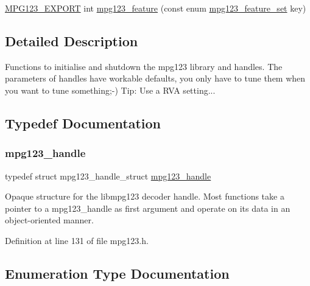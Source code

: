 \begin{DoxyCompactItemize}
\item 
\mbox{\hyperlink{mpg123_8h_a2ba98cfba3f760879df70e755b2a61cc}{M\+P\+G123\+\_\+\+E\+X\+P\+O\+RT}} int \mbox{\hyperlink{group__mpg123__init_gaf9b00e4fc7273c0d5e41d6d490606d56}{mpg123\+\_\+feature}} (const enum \mbox{\hyperlink{group__mpg123__init_gab26f1b8c3289847f5928176a20b4c942}{mpg123\+\_\+feature\+\_\+set}} key)
\end{DoxyCompactItemize}


\subsection{Detailed Description}
Functions to initialise and shutdown the mpg123 library and handles. The parameters of handles have workable defaults, you only have to tune them when you want to tune something;-\/) Tip\+: Use a R\+VA setting... 

\subsection{Typedef Documentation}
\mbox{\label{group__mpg123__init_ga6728e2839a395f3a07d4514da659faca}} 
\subsubsection{\texorpdfstring{mpg123\_handle}{mpg123\_handle}}
{\footnotesize\ttfamily typedef struct mpg123\+\_\+handle\+\_\+struct \mbox{\hyperlink{group__mpg123__init_ga6728e2839a395f3a07d4514da659faca}{mpg123\+\_\+handle}}}

Opaque structure for the libmpg123 decoder handle. Most functions take a pointer to a mpg123\+\_\+handle as first argument and operate on its data in an object-\/oriented manner. 

Definition at line 131 of file mpg123.\+h.



\subsection{Enumeration Type Documentation}
\mbox{\label{group__mpg123__init_gab26f1b8c3289847f5928176a20b4c942}} 
